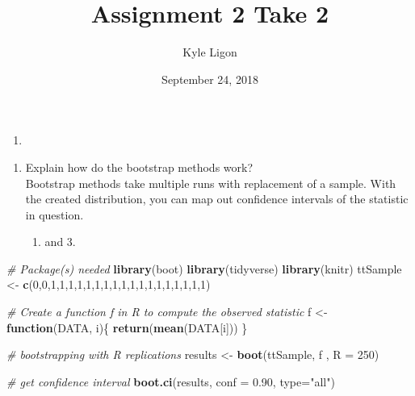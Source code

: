 \documentclass[]{article}
\title{Assignment 2 Take 2}
\author{Kyle Ligon}
\date{September 24, 2018}
\newenvironment{Shaded}{\begin{snugshade}}{\end{snugshade}}
\newcommand{\KeywordTok}[1]{\textcolor[rgb]{0.13,0.29,0.53}{\textbf{#1}}}
\newcommand{\DataTypeTok}[1]{\textcolor[rgb]{0.13,0.29,0.53}{#1}}
\newcommand{\DecValTok}[1]{\textcolor[rgb]{0.00,0.00,0.81}{#1}}
\newcommand{\FloatTok}[1]{\textcolor[rgb]{0.00,0.00,0.81}{#1}}
\newcommand{\StringTok}[1]{\textcolor[rgb]{0.31,0.60,0.02}{#1}}
\newcommand{\CommentTok}[1]{\textcolor[rgb]{0.56,0.35,0.01}{\textit{#1}}}
\newcommand{\ControlFlowTok}[1]{\textcolor[rgb]{0.13,0.29,0.53}{\textbf{#1}}}
\newcommand{\NormalTok}[1]{#1}
\providecommand{\tightlist}{%
  \setlength{\itemsep}{0pt}\setlength{\parskip}{0pt}}
\begin{document}
\maketitle

\begin{enumerate}
\def\labelenumi{\Alph{enumi})}
\item
\end{enumerate}

\begin{enumerate}
\def\labelenumi{\arabic{enumi}.}
\tightlist
\item
  Explain how do the bootstrap methods work?\\
  Bootstrap methods take multiple runs with replacement of a sample.
  With the created distribution, you can map out confidence intervals of
  the statistic in question.

  \begin{enumerate}
  \def\labelenumii{\arabic{enumii}.}
  \setcounter{enumii}{1}
  \tightlist
  \item
    and 3.
  \end{enumerate}
\end{enumerate}

\begin{Shaded}
\begin{Highlighting}[]
\CommentTok{# Package(s) needed }
\KeywordTok{library}\NormalTok{(boot)}
\KeywordTok{library}\NormalTok{(tidyverse)}
\KeywordTok{library}\NormalTok{(knitr)}
\NormalTok{ttSample <-}\StringTok{ }\KeywordTok{c}\NormalTok{(}\DecValTok{0}\NormalTok{,}\DecValTok{0}\NormalTok{,}\DecValTok{1}\NormalTok{,}\DecValTok{1}\NormalTok{,}\DecValTok{1}\NormalTok{,}\DecValTok{1}\NormalTok{,}\DecValTok{1}\NormalTok{,}\DecValTok{1}\NormalTok{,}\DecValTok{1}\NormalTok{,}\DecValTok{1}\NormalTok{,}\DecValTok{1}\NormalTok{,}\DecValTok{1}\NormalTok{,}\DecValTok{1}\NormalTok{,}\DecValTok{1}\NormalTok{,}\DecValTok{1}\NormalTok{,}\DecValTok{1}\NormalTok{,}\DecValTok{1}\NormalTok{,}\DecValTok{1}\NormalTok{,}\DecValTok{1}\NormalTok{,}\DecValTok{1}\NormalTok{)}

\CommentTok{# Create a function f in R to compute the observed statistic}
\NormalTok{f <-}\StringTok{ }\ControlFlowTok{function}\NormalTok{(DATA, i)\{}
  \KeywordTok{return}\NormalTok{(}\KeywordTok{mean}\NormalTok{(DATA[i]))}
\NormalTok{\}}

\CommentTok{# bootstrapping with R replications }
\NormalTok{results <-}\StringTok{ }\KeywordTok{boot}\NormalTok{(ttSample, f , }\DataTypeTok{R =} \DecValTok{250}\NormalTok{)}

\CommentTok{# get confidence interval }
\KeywordTok{boot.ci}\NormalTok{(results, }\DataTypeTok{conf =} \FloatTok{0.90}\NormalTok{, }\DataTypeTok{type=}\StringTok{"all"}\NormalTok{)}
\end{Highlighting}
\end{Shaded}
\end{document}
